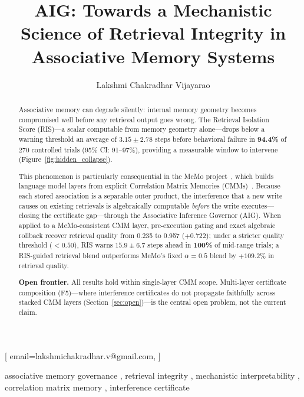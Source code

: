 \documentclass{ceurart}
\begin{document}


\title{AIG: Towards a Mechanistic Science of Retrieval Integrity
  in Associative Memory Systems}

\author{Lakshmi Chakradhar Vijayarao}[%
  email=lakshmichakradhar.v@gmail.com,
]

\begin{abstract}
Associative memory can degrade silently: internal memory geometry becomes
compromised well before any retrieval output goes wrong.
The Retrieval Isolation Score (RIS)---a scalar computable from memory geometry
alone---drops below a warning threshold an average of $3.15{\pm}2.78$ steps
before behavioral failure in \textbf{94.4\%} of 270 controlled trials
(95\% CI: 91--97\%), providing a measurable window to intervene
(Figure~\ref{fig:hidden_collapse}).

This phenomenon is particularly consequential in the MeMo
project~\citep{zanzotto2025memo}, which builds language model layers from
explicit Correlation Matrix Memories (CMMs)~\citep{kohonen1972correlation}.
Because each stored association is a separable outer product, the interference
that a new write causes on existing retrievals is algebraically computable
\emph{before} the write executes---closing the certificate gap---through the
Associative Inference Governor (AIG).
When applied to a MeMo-consistent CMM layer, pre-execution gating and exact
algebraic rollback recover retrieval quality from 0.235 to 0.957 ($+0.722$);
under a stricter quality threshold ($<0.50$), RIS warns $15.9{\pm}6.7$ steps
ahead in \textbf{100\%} of mid-range trials; a RIS-guided retrieval blend
outperforms MeMo's fixed $\alpha{=}0.5$ blend by $+109.2\%$ in retrieval quality.

\noindent\textbf{Open frontier.}
All results hold within single-layer CMM scope.
Multi-layer certificate composition (F5)---where interference certificates do not
propagate faithfully across stacked CMM layers (Section~\ref{sec:open})---is
the central open problem, not the current claim.
\end{abstract}

\begin{keywords}
  associative memory governance \sep
  retrieval integrity \sep
  mechanistic interpretability \sep
  correlation matrix memory \sep
  interference certificate
\end{keywords}
\end{document}
